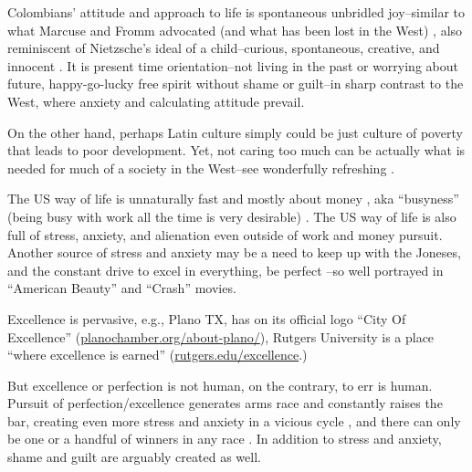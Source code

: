 \documentclass[10pt, letterpaper]{article}
\begin{document}
\begin{spacing}{2}
Colombians' attitude and approach to life is spontaneous unbridled
joy--similar to what Marcuse and Fromm advocated (and what has been lost in the West)
\citep{marcuse15,fromm13,fromm12,fromm64,fromm94}, %
 also reminiscent of Nietzsche's ideal of a child--curious, spontaneous,
creative, and innocent \citep{nietzsche05alt}. 
%
 It is present time orientation--not living in the past or worrying about future,
happy-go-lucky free spirit without shame or guilt--in sharp
contrast to the West, where anxiety and calculating attitude 
prevail.

{On the other hand, perhaps Latin culture simply could be just culture
  of poverty \citep{banfield67,banfield74} that leads to poor development. Yet, not caring too much can be actually what is needed for much of
  a society in the West--see wonderfully refreshing \citet{manson15}.}
 
The US way of life is unnaturally fast and mostly about money \citep{easterlin73},
 aka ``busyness'' (being busy with work all the time is very desirable)  \citep{gershuny2005busyness, muskIN18nov26}.
 The US way of life is also full of stress, anxiety, and alienation even outside of work and money pursuit.  
  Another source of stress and anxiety may be a need to keep up with the Joneses, and the constant drive to excel in
  everything, be perfect \citep{frank12,manson15}--so well portrayed in 
  ``American Beauty'' and ``Crash'' movies. {
    Excellence is pervasive, e.g., Plano TX, has on its official logo ``City Of
    Excellence'' (\url{planochamber.org/about-plano/}), Rutgers University is a
    place ``where excellence is earned''  (\url{rutgers.edu/excellence}.) 

    But excellence or perfection is not human, on the contrary, to
    err is human. 
 Pursuit of perfection/excellence generates arms race and constantly raises the
 bar, creating even more stress and anxiety in a vicious cycle%
, and
 there can only be one or a handful of winners in any race \citep{frank12,manson15}. In addition to
 stress and anxiety, shame and guilt are arguably created as well. 
}
 

\end{spacing}
\end{document}
